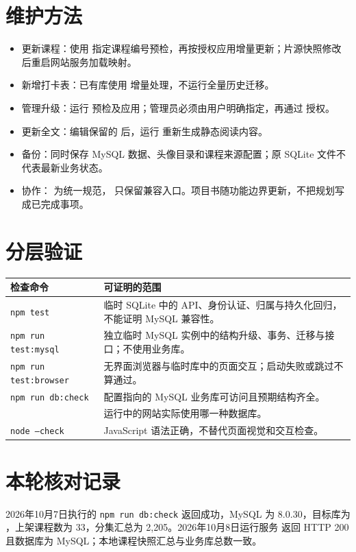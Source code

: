 \documentclass[UTF8,12pt,a4paper,openany,oneside]{ctexbook}
\begin{document}
\section{维护方法}
\begin{itemize}
\item 更新课程：使用  指定课程编号预检，再按授权应用增量更新；片源快照修改后重启网站服务加载映射。
\item 新增打卡表：已有库使用  增量处理，不运行全量历史迁移。
\item 管理升级：运行  预检及应用；管理员必须由用户明确指定，再通过  授权。
\item 更新全文：编辑保留的  后，运行  重新生成静态阅读内容。
\item 备份：同时保存 MySQL 数据、头像目录和课程来源配置；原 SQLite 文件不代表最新业务状态。
\item 协作： 为统一规范， 只保留兼容入口。项目书随功能边界更新，不把规划写成已完成事项。
\end{itemize}

\section{分层验证}
{\small
\begin{longtable}{P{0.30\textwidth}P{0.56\textwidth}}
\toprule 检查命令 & 可证明的范围 \\ \midrule
\texttt{npm test} & 临时 SQLite 中的 API、身份认证、归属与持久化回归，不能证明 MySQL 兼容性。 \\
\texttt{npm run test:mysql} & 独立临时 MySQL 实例中的结构升级、事务、迁移与接口；不使用业务库。 \\
\texttt{npm run test:browser} & 无界面浏览器与临时库中的页面交互；启动失败或跳过不算通过。 \\
\texttt{npm run db:check} & 配置指向的 MySQL 业务库可访问且预期结构齐全。 \\
 & 运行中的网站实际使用哪一种数据库。 \\
\texttt{node --check} & JavaScript 语法正确，不替代页面视觉和交互检查。 \\
\bottomrule
\end{longtable}}

\section{本轮核对记录}
2026年10月7日执行的 \texttt{npm run db:check} 返回成功，MySQL 为 8.0.30，目标库为 ，上架课程数为 33，分集汇总为 2,205。2026年10月8日运行服务  返回 HTTP 200 且数据库为 MySQL；本地课程快照汇总与业务库总数一致。
\end{document}
